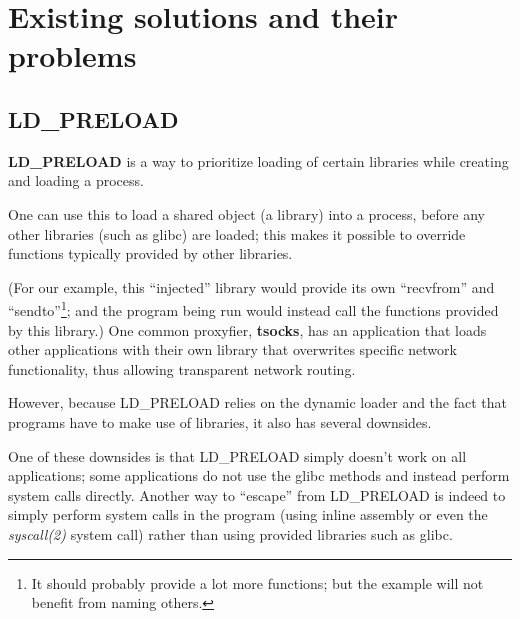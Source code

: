 \documentclass[a4paper, twoside, 10pt, twocolumn]{report}
\begin{document}


%

\section{Existing solutions and their problems}



\subsection{LD\_PRELOAD}

\textbf{LD\_PRELOAD} is a way to prioritize loading of certain libraries
while creating and loading a process.

One can use this to load a shared object (a library) into a process,
before any other libraries (such as glibc) are loaded;
this makes it possible to override functions typically provided by other
libraries.

(For our example, this ``injected'' library would provide its own
``recvfrom'' and ``sendto''\footnote{It should probably provide
a lot more functions; but the example will not benefit from naming others.};
and the program being run
would instead call the functions provided by this library.) One common
proxyfier, \textbf{tsocks}, has an application that loads other applications
with their own library that overwrites specific network functionality,
thus allowing transparent network routing.

However, because LD\_PRELOAD relies on the dynamic loader and the fact that
programs have to make use of libraries, it also has several downsides.

One of these downsides is that LD\_PRELOAD simply doesn't work on all
applications; some applications do not use the glibc methods and instead
perform system calls directly. Another way to ``escape'' from LD\_PRELOAD
is indeed to simply perform system calls in the program (using inline assembly
or even the \textit{syscall(2)} system call) rather than using
provided libraries such as glibc.
\end{document}
